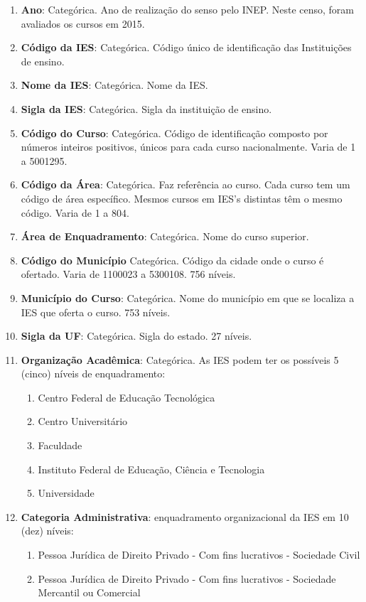 	\begin{enumerate}
	\item \textbf{Ano}: Categórica. Ano de realização do senso pelo INEP. Neste censo, foram avaliados os cursos em 2015.\
	\item \textbf{Código da IES}: Categórica. Código único de identificação das Instituições de ensino.\
	\item \textbf{Nome da IES}: Categórica. Nome da IES.\
	\item \textbf{Sigla da IES}: Categórica. Sigla da instituição de ensino.
	\item \textbf{Código do Curso}: Categórica. Código de identificação composto por números inteiros positivos, únicos para cada curso nacionalmente. Varia de 1 a 5001295.
	\item \textbf{Código da Área}: Categórica. Faz referência ao curso. Cada curso tem um código de área específico. Mesmos cursos em IES's distintas têm o mesmo código. Varia de 1 a 804.
	\item \textbf{Área de Enquadramento}: Categórica. Nome do curso superior.
	\item \textbf{Código do Município} Categórica. Código da cidade onde o curso é ofertado. Varia de 1100023 a 5300108. 756 níveis.
	\item \textbf{Município do Curso}: Categórica. Nome do município em que se localiza a IES que oferta o curso. 753 níveis.
	\item \textbf{Sigla da UF}: Categórica. Sigla do estado. 27 níveis.
	\item \textbf{Organização Acadêmica}: Categórica. As IES podem ter os possíveis 5 (cinco) níveis de enquadramento:
		\begin{enumerate}
			\item Centro Federal de Educação Tecnológica
			\item Centro Universitário 
			\item Faculdade 
			\item Instituto Federal de Educação, Ciência e Tecnologia 
			\item Universidade 
		\end{enumerate}
	\item \textbf{Categoria Administrativa}: enquadramento organizacional da IES em 10 (dez) níveis:
		\begin{enumerate}	
			\item Pessoa Jurídica de Direito Privado - Com fins lucrativos - Sociedade Civil                 
			\item Pessoa Jurídica de Direito Privado - Com fins lucrativos - Sociedade Mercantil ou Comercial

\end{enumerate}
\end{enumerate}
